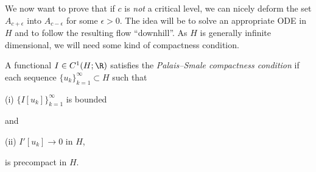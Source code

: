 We now want to prove that if $c$ is \textit{not} a critical level, we can nicely deform the set $A_{c+\epsilon}$ into $A_{c-\epsilon}$ for some $\epsilon > 0$. The idea will be to solve an appropriate ODE in $H$ and to follow the resulting flow ``downhill''. As $H$ is generally infinite dimensional, we will need some kind of compactness condition.

\begin{definition}
\label{def:palais-smale-condition}
A functional $I \in C^1(H;\R)$ satisfies the \textit{Palais--Smale compactness condition} if each sequence $\{u_k\}_{k=1}^\infty \subset H$ such that

(i) $\{I[u_k]\}_{k=1}^\infty$ is bounded

and

(ii) $I'[u_k] \to 0$ in $H$,

is precompact in $H$.
\end{definition}

